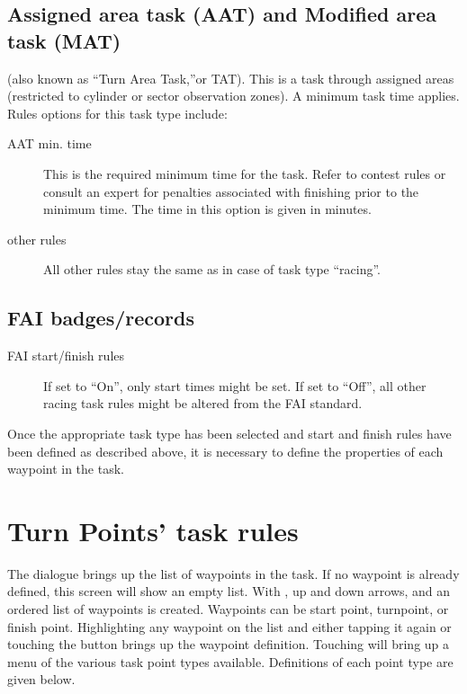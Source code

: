 \subsection*{Assigned area task (AAT) and Modified area task (MAT)}
(also known as ``Turn Area Task,''or TAT).  This is a task through assigned
areas (restricted to cylinder or sector observation zones).  A minimum task time 
applies.  Rules options for this task type include:
  \begin{description}
  \item [AAT min. time]  This is the required minimum time for the task.  Refer 
    to contest rules or consult an expert for penalties associated with finishing 
    prior to the minimum time.  The time in this option is given in minutes.
  \item [other rules] All other rules stay the same as in case of task type 
    ``racing''.
  \end{description}


\subsection*{FAI badges/records}
  \begin{description}
  \item [FAI start/finish rules] If set to ``On'', only start times might be set. 
  If set to ``Off'', all other racing task rules might be altered from the FAI standard.
  \end{description}

Once the appropriate task type has been selected and start and finish rules 
have been defined as described above, it is necessary to define the properties 
of each waypoint in the task.  

\section{Turn Points' task rules}\label{sec:task-rules}

The  dialogue brings up the list of waypoints in the task. 
 If no waypoint is already defined, this screen 
will show an empty list. With , up and down arrows, and 
 an ordered list of waypoints is created. 
Waypoints can be start point, turnpoint, or finish point.
Highlighting any waypoint on the list and either tapping it again or 
touching the  button brings up the waypoint definition. 
Touching  will bring up a menu of the various task point 
types available.  Definitions of each point type are given below.

